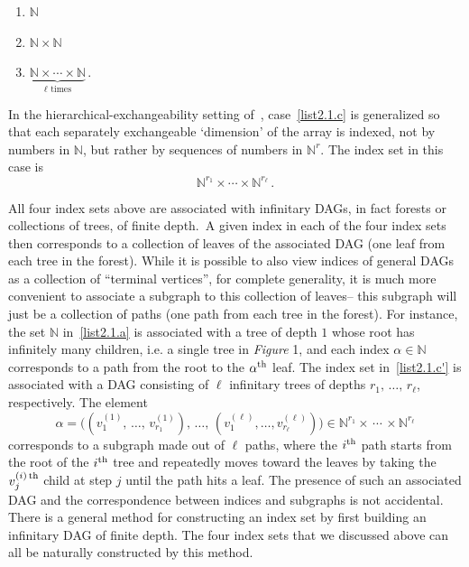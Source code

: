 \documentclass[10pt]{amsart}
\theoremstyle{definition}\newtheorem{defi}[theo]{Definition}\newtheorem{rema}[theo]{Remark}\newtheorem{exam}[theo]{Example}\newtheorem{exem}[theo]{Example}\newtheorem{nota}[theo]{Notation}
\newcommand*\N{\mathbb{N}}
\newcommand*{\alphenumi}{\renewcommand*{\theenumi}{\alph{enumi}}}
\begin{document}
\begin{enumerate}\alphenumi
\item \label{list2.1.a}$\N$ 
\item \label{list2.1.b}$\N\times\N$ 
\item \label{list2.1.c}$\underbrace{\N\times\cdots\times\N}_{\ell \text{ times}}\,$.
\end{enumerate}
In the hierarchical-exchangeability setting of~\cite{austin:panchenko:2014}, case~\eqref{list2.1.c} is generalized so that each separately exchangeable `dimension' of the array is indexed, not by numbers in $\N$, but rather by sequences of numbers in $\N^r$. The index set in this case is
\begin{equation*}
\tag{$c'$} \N^{r_1}\times\cdots\times\N^{r_\ell}\,\label{list2.1.c'}.
\end{equation*}

All four index sets above are associated with infinitary DAGs, in fact forests or collections of trees, of finite depth.~A given index in each of the four index sets then corresponds to a collection of leaves of the associated DAG (one leaf from each tree in the forest). While it is possible to also view indices of general DAGs as a collection of ``terminal vertices'', for complete generality, it is much more convenient to associate a subgraph to this collection of leaves-- this subgraph will just be a collection of paths (one path from each tree in the forest). For instance, the set $\N$ in~\eqref{list2.1.a} is associated with a tree of depth $1$ whose root has infinitely many children, i.e. a single tree in \emph{Figure} 1, and each index $\alpha\in\N$ corresponds to a path from the root to the $\alpha^{\rm th}$ leaf. The index set in~\eqref{list2.1.c'} is associated with a DAG consisting of $\ell$ infinitary trees of depths $r_1,\,\ldots,\,r_\ell$, respectively. The element
\[
\alpha = \Bigg(\left(v^{(1)}_1,\,\ldots,\,v^{(1)}_{r_1}\right),\,\ldots,\,\left(v^{(\ell)}_1,\ldots,v^{(\ell)}_{r_\ell}\right)\Bigg) \in \N^{r_1}\times\,\cdots\,\times\N^{r_\ell}
\]
corresponds to a subgraph made out of $\ell$ paths, where the $i^{\rm th}$ path starts from the root of the $i^{\rm th}$ tree and repeatedly moves toward the leaves by taking the $v^{(i)\,\rm th}_j$ child at step $j$ until the path hits a leaf.
%
The presence of such an associated DAG and the correspondence between indices and subgraphs is not accidental. There is a general method for constructing an index set by first building an infinitary DAG of finite depth. The four index sets that we discussed above can all be naturally constructed by this method.
\end{document}
